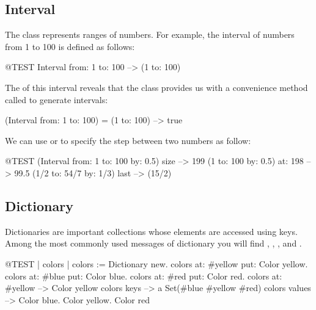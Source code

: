 \documentclass[a4paper,10pt,twoside]{book}
\begin{document}

\subsection{Interval}
The class  represents ranges of numbers. For example, the interval of numbers from 1 to 100 is defined as follows:
\begin{code}{@TEST}
Interval from: 1 to: 100 --> (1 to: 100)
\end{code}

\noindent
The  of this interval reveals that the class  provides us with a convenience method called  to generate intervals:

\begin{code}{}
(Interval from: 1 to: 100) = (1 to: 100) --> true
\end{code}

We can use  or  to specify the step between two numbers as follow:

\begin{code}{@TEST}
(Interval from: 1 to: 100 by: 0.5) size --> 199
(1 to: 100 by: 0.5) at: 198 --> 99.5
(1/2 to: 54/7 by: 1/3) last --> (15/2)
\end{code}

\subsection{Dictionary}
Dictionaries are important collections whose elements are accessed using keys. 
Among the most commonly used messages of dictionary you will find , , ,  and .

\begin{code}{@TEST | colors |}
colors := Dictionary new.
colors at: #yellow put: Color yellow.
colors at: #blue put: Color blue.
colors at: #red put: Color red.
colors at: #yellow --> Color yellow
colors keys          --> a Set(#blue #yellow #red)
colors values       --> {Color blue. Color yellow. Color red}
\end{code}
\end{document}
